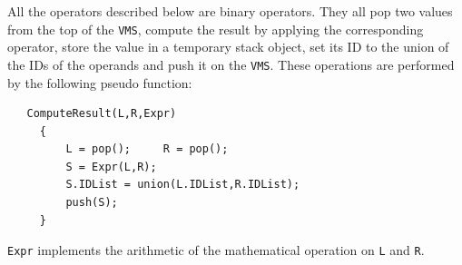 \documentclass[12pt]{article}
\newcommand{\VMS}{{\tt VMS}}
\begin{document}
All the operators described below are binary operators.  They all pop
two values from the top of the \VMS, compute the result by applying
the corresponding operator, store the value in a temporary stack
object, set its ID to the union of the IDs of the operands and push it
on the \VMS.  These operations are performed by the following pseudo
function:
\begin{verbatim}
   ComputeResult(L,R,Expr)
     {
         L = pop();     R = pop();
         S = Expr(L,R);
         S.IDList = union(L.IDList,R.IDList);
         push(S);
     }
\end{verbatim}
{\tt Expr} implements the arithmetic of the mathematical operation on
{\tt L} and {\tt R}. 

\end{document}
